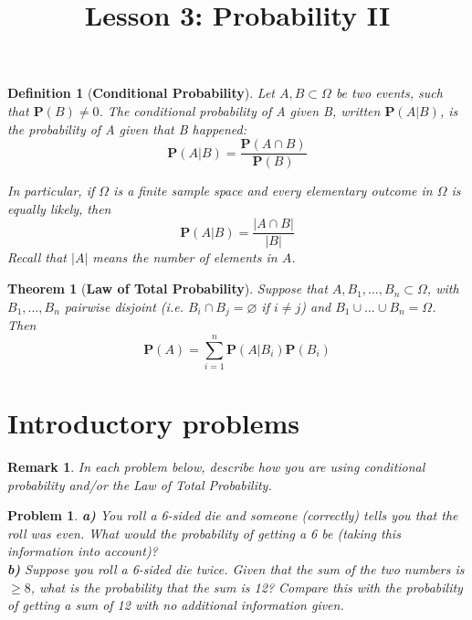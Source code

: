 \documentclass[a4paper,12pt]{article}
\title{Lesson 3: Probability II }
\theoremstyle{perfect}
\newtheorem{thm}{Theorem}
\newtheorem{dfn}{Definition}
\newtheorem{Remark}{Remark}
\newtheorem{prb}{Problem}
\begin{document}
 
\maketitle


\begin{dfn}[\textbf{Conditional Probability}]
Let $A, B \subset \Omega$ be two events, such that $\mathbf{P}(B) \neq 0$. 
The conditional probability of A given B, written $\mathbf{P}(A|B)$, 
is the probability of A given that B happened:
\begin{equation}\label{condprob}
\mathbf{P}(A|B) = \frac{\mathbf{P}(A \cap B)}{\mathbf{P}(B)}
\end{equation}

\noindent
In particular, if $\Omega$ is a finite sample space and every elementary outcome in $\Omega$ is equally likely, then 
\begin{equation}
\mathbf{P}(A|B) = \frac{|A \cap B|}{|B|}
\end{equation}
Recall that $|A|$ means the number of elements in $A$. 
\end{dfn}

\begin{thm}[\textbf{Law of Total Probability}]
Suppose that $A, B_1, \dots , B_n \subset \Omega$, with $B_1, \dots, B_n$ pairwise
disjoint (i.e. $B_i \cap B_j = \varnothing$ if $i \neq j$) and $B_1 \cup \dots \cup B_n = \Omega$. Then
\begin{equation}
\mathbf{P}(A) = \sum_{i=1}^n \mathbf{P}(A|B_i)\mathbf{P}(B_i)
\end{equation}
\end{thm}



\section{Introductory problems}

\begin{Remark}
In each problem below, describe how you are using conditional probability and/or the Law of Total Probability.
\end{Remark}

\begin{prb}
\textbf{a)} You roll a 6-sided die and someone (correctly) tells you that the roll was even. What would the probability of getting a 6 be (taking this information into account)? \\
\textbf{b)} Suppose you roll a 6-sided die twice. Given that the sum of the two numbers is $\geq 8$, what is the probability that the sum is 12? Compare this with the 
probability of getting a sum of 12 with no additional information given.
\end{prb}
\end{document}
